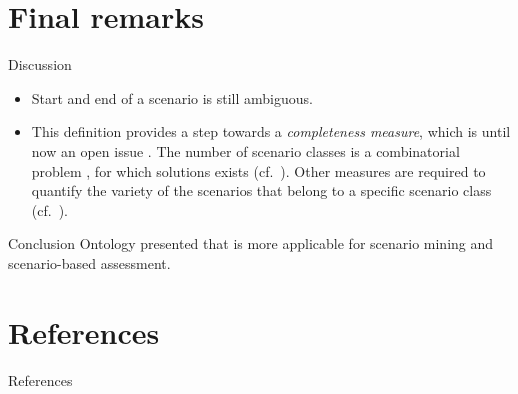 \documentclass[aspectratio=\AspectR,10pt,compress,t]{beamer} %
\begin{document}
\section{Final remarks}
\begin{frame}{Discussion}
	\begin{itemize}
		\item Start and end of a scenario is still ambiguous.
		\item This definition provides a step towards a \emph{completeness measure}, which is until now an open issue \cite{geyer2014, alvarez2017prospective, stellet2015taxonomy}. The number of scenario classes is a combinatorial problem \cite{geyer2014}, for which solutions exists (cf.\ \cite{yang2012estimating, bunge1993estimating}). Other measures are required to quantify the variety of the scenarios that belong to a specific scenario class (cf.~\cite{wang2017much}).
	\end{itemize}
\end{frame}

\begin{frame}{Conclusion}
	Ontology presented that is more applicable for scenario mining and scenario-based assessment.
\end{frame}

\section{References}
\begin{frame}{References}
\end{frame}

\begin{frame}[allowframebreaks]
	\scriptsize{}
	
\end{frame}
\end{document}
